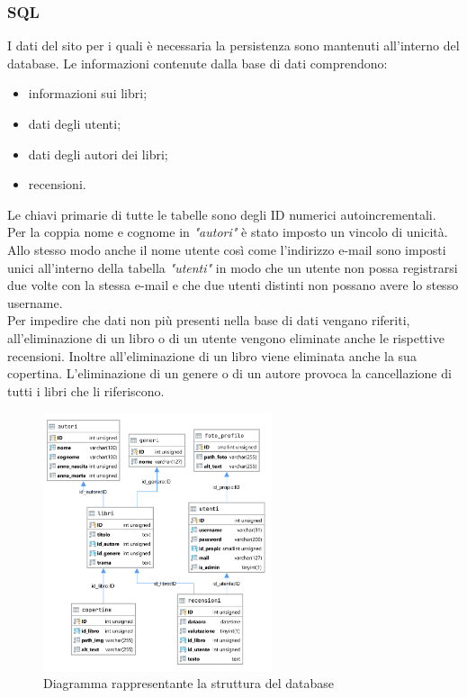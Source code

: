 \documentclass[12pt,a4paper,headings=optiontohead]{article}
\begin{document}
\subsubsection{SQL}
I dati del sito per i quali è necessaria la persistenza sono mantenuti all'interno del database. Le informazioni contenute dalla base di dati comprendono:
\begin{itemize}
	\item informazioni sui libri;
	\item dati degli utenti;
	\item dati degli autori dei libri;
	\item recensioni.
\end{itemize}
Le chiavi primarie di tutte le tabelle sono degli ID numerici autoincrementali. \\
Per la coppia nome e cognome in \textit{"autori"} è stato imposto un vincolo di unicità. Allo stesso modo anche il nome utente così come l'indirizzo e-mail sono imposti unici all'interno della tabella \textit{"utenti"} in modo che un utente non possa registrarsi due volte con la stessa e-mail e che due utenti distinti non possano avere lo stesso username.\\  
Per impedire che dati non più presenti nella base di dati vengano riferiti, all'eliminazione di un libro o di un utente vengono eliminate anche le rispettive recensioni. Inoltre all'eliminazione di un libro viene eliminata anche la sua copertina. L'eliminazione di un genere o di un autore provoca la cancellazione di tutti i libri che li riferiscono.
\begin{figure}[h!]
	\caption{Diagramma rappresentante la struttura del database}
\includegraphics[width=0.6\textwidth]{../img/db_diagram/betweenthelines.png}
\end{figure}
\end{document}
